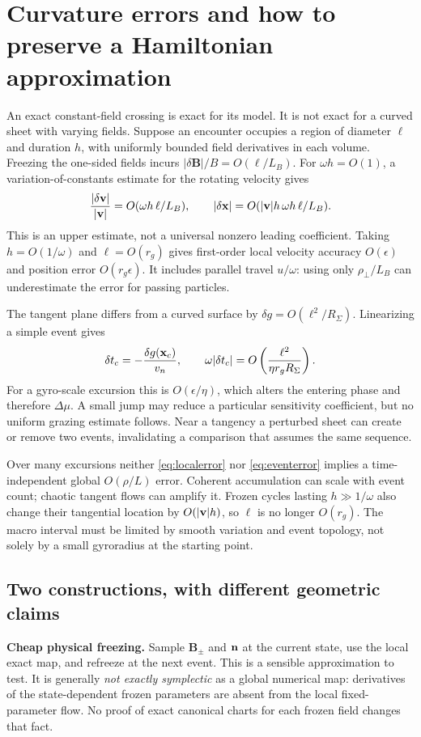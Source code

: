 \documentclass[10pt,a4paper]{article}
\newcommand{\B}{\mathbf B}\newcommand{\bunit}{\mathbf b}
\begin{document}
\section{Curvature errors and how to preserve a Hamiltonian approximation}
\label{sec:errors}
An exact constant-field crossing is exact for its model. It is not exact for a curved sheet with varying fields. Suppose an encounter occupies a region of diameter $\ell$ and duration $h$, with uniformly bounded field derivatives in each volume. Freezing the one-sided fields incurs $|\delta\B|/B=O(\ell/L_B)$. For $\omega h=O(1)$, a variation-of-constants estimate for the rotating velocity gives
\begin{equation}\label{eq:localerror}
 \frac{|\delta\mathbf v|}{|\mathbf v|}=O(\omega h\,\ell/L_B),\qquad
 |\delta\mathbf x|=O(|\mathbf v|h\,\omega h\,\ell/L_B).
\end{equation}
This is an upper estimate, not a universal nonzero leading coefficient. Taking $h=O(1/\omega)$ and $\ell=O(r_g)$ gives first-order local velocity accuracy $O(\epsilon)$ and position error $O(r_g\epsilon)$. It includes parallel travel $u/\omega$: using only $\rho_\perp/L_B$ can underestimate the error for passing particles.

The tangent plane differs from a curved surface by $\delta g=O(\ell^2/R_\Sigma)$. Linearizing a simple event gives
\begin{equation}\label{eq:eventerror}
 \delta t_c=-\frac{\delta g(\mathbf x_c)}{v_n},\qquad
 \omega|\delta t_c|=O\left(\frac{\ell^2}{\eta r_g R_\Sigma}\right).
\end{equation}
For a gyro-scale excursion this is $O(\epsilon/\eta)$, which alters the entering phase and therefore $\Delta\mu$. A small jump may reduce a particular sensitivity coefficient, but no uniform grazing estimate follows. Near a tangency a perturbed sheet can create or remove two events, invalidating a comparison that assumes the same sequence.

Over many excursions neither \eqref{eq:localerror} nor \eqref{eq:eventerror} implies a time-independent global $O(\rho/L)$ error. Coherent accumulation can scale with event count; chaotic tangent flows can amplify it. Frozen cycles lasting $h\gg1/\omega$ also change their tangential location by $O(|\mathbf v|h)$, so $\ell$ is no longer $O(r_g)$. The macro interval must be limited by smooth variation and event topology, not solely by a small gyroradius at the starting point.

\subsection{Two constructions, with different geometric claims}
\textbf{Cheap physical freezing.} Sample $\B_\pm$ and $\mathbf n$ at the current state, use the local exact map, and refreeze at the next event. This is a sensible approximation to test. It is generally \emph{not exactly symplectic} as a global numerical map: derivatives of the state-dependent frozen parameters are absent from the local fixed-parameter flow. No proof of exact canonical charts for each frozen field changes that fact.
\end{document}
